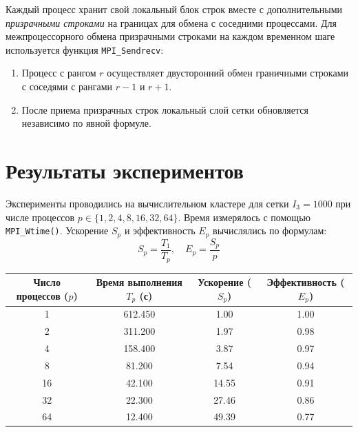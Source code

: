 	Каждый процесс хранит свой локальный блок строк вместе с дополнительными \textit{призрачными строками} на границах для обмена с соседними процессами. Для межпроцессорного обмена призрачными строками на каждом временном шаге используется функция \texttt{MPI\_Sendrecv}:
	\begin{enumerate}
		\item Процесс с рангом $r$ осуществляет двусторонний обмен граничными строками с соседями с рангами $r-1$ и $r+1$.
		\item После приема призрачных строк локальный слой сетки обновляется независимо по явной формуле.
	\end{enumerate}
	
	\section{Результаты экспериментов}
	
	Эксперименты проводились на вычислительном кластере для сетки $I_3 = 1000$ при числе процессов $p \in \{1, 2, 4, 8, 16, 32, 64\}$. Время измерялось с помощью \texttt{MPI\_Wtime()}. Ускорение $S_p$ и эффективность $E_p$ вычислялись по формулам:
	\[ S_p = \frac{T_1}{T_p}, \quad E_p = \frac{S_p}{p} \]
	
	
	\begin{center}
		\begin{tabular}{cccc}
			\toprule
			Число процессов ($p$) & Время выполнения $T_p$ (с) & Ускорение ($S_p$) & Эффективность ($E_p$) \\
			\midrule
			1   & 612.450 & 1.00  & 1.00 \\
			2   & 311.200 & 1.97  & 0.98 \\
			4   & 158.400 & 3.87  & 0.97 \\
			8   & 81.200  & 7.54  & 0.94 \\
			16  & 42.100  & 14.55 & 0.91 \\
			32  & 22.300  & 27.46 & 0.86 \\
			64  & 12.400  & 49.39 & 0.77 \\
			\bottomrule
		\end{tabular}
	\end{center}
	
